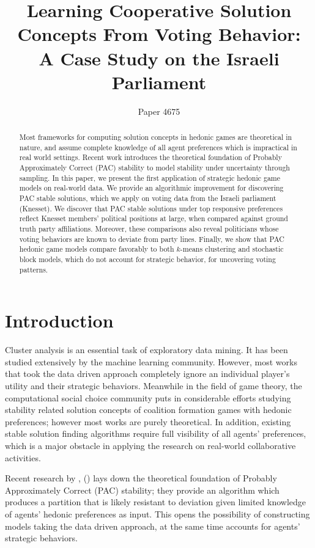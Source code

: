 \documentclass[letterpaper]{article} %
\title{Learning Cooperative Solution Concepts From Voting Behavior:\\ A Case Study on the Israeli Parliament}
\author{Paper 4675}
\newcommand{\citename}[1]{\citeauthor{#1}, (\citeyear{#1})}
\theoremstyle{definition}
\begin{document}
\maketitle

\begin{abstract}
Most frameworks for computing solution concepts in hedonic games are theoretical in nature, and assume complete knowledge of all agent preferences which is impractical in real world settings.
Recent work introduces the theoretical foundation of Probably Approximately Correct (PAC) stability to model stability under uncertainty through sampling.
In this paper, we present the first application of strategic hedonic game models on real-world data.
We provide an algorithmic improvement for discovering PAC stable solutions, which we apply on voting data from the Israeli parliament (Knesset). 
We discover that PAC stable solutions under top responsive preferences reflect Knesset members' political positions at large, when compared against ground truth party affiliations.
Moreover, these comparisons also reveal politicians whose voting behaviors are known to deviate from party lines.
Finally, we show that PAC hedonic game models compare favorably to both $k$-means clustering and stochastic block models, which do not account for strategic behavior, for uncovering voting patterns.
\end{abstract}

\section{Introduction}\label{sec:intro}
Cluster analysis is an essential task of exploratory data mining. It has been studied extensively by the machine learning community. However, most works that took the data driven approach completely ignore an individual player's utility and their strategic behaviors. Meanwhile in the field of game theory, the computational social choice community puts in considerable efforts studying stability related solution concepts of coalition formation games with hedonic preferences; however most works are purely theoretical. In addition, existing stable solution finding algorithms require full visibility of all agents' preferences, which is a major obstacle in applying the research on real-world collaborative activities.

Recent research by \citename{ijcai2017-380} lays down the theoretical foundation of Probably Approximately Correct (PAC) stability; they provide an algorithm which produces a partition that is likely resistant to deviation given limited knowledge of agents' hedonic preferences as input. This opens the possibility of constructing models taking the data driven approach, at the same time accounts for agents' strategic behaviors.
\end{document}
